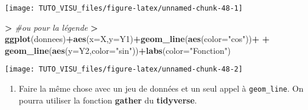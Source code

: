 \documentclass[]{article}
\newenvironment{Shaded}{\begin{snugshade}}{\end{snugshade}}
\newcommand{\CommentTok}[1]{\textcolor[rgb]{0.56,0.35,0.01}{\textit{#1}}}
\newcommand{\DataTypeTok}[1]{\textcolor[rgb]{0.13,0.29,0.53}{#1}}
\newcommand{\ErrorTok}[1]{\textcolor[rgb]{0.64,0.00,0.00}{\textbf{#1}}}
\newcommand{\KeywordTok}[1]{\textcolor[rgb]{0.13,0.29,0.53}{\textbf{#1}}}
\newcommand{\NormalTok}[1]{#1}
\newcommand{\OperatorTok}[1]{\textcolor[rgb]{0.81,0.36,0.00}{\textbf{#1}}}
\newcommand{\StringTok}[1]{\textcolor[rgb]{0.31,0.60,0.02}{#1}}
\providecommand{\tightlist}{%
  \setlength{\itemsep}{0pt}\setlength{\parskip}{0pt}}
\theoremstyle{definition}
\theoremstyle{definition}
\theoremstyle{definition}
\theoremstyle{remark}
\begin{document}
\begin{center}\texttt{[image: TUTO\_VISU\_files/figure-latex/unnamed-chunk-48-1]} \end{center}

\begin{Shaded}
\begin{Highlighting}[]
\OperatorTok{>}\StringTok{ }\CommentTok{#ou pour la légende}
\ErrorTok{>}\StringTok{ }\KeywordTok{ggplot}\NormalTok{(donnees)}\OperatorTok{+}\KeywordTok{aes}\NormalTok{(}\DataTypeTok{x=}\NormalTok{X,}\DataTypeTok{y=}\NormalTok{Y1)}\OperatorTok{+}\KeywordTok{geom_line}\NormalTok{(}\KeywordTok{aes}\NormalTok{(}\DataTypeTok{color=}\StringTok{"cos"}\NormalTok{))}\OperatorTok{+}
\OperatorTok{+}\StringTok{   }\KeywordTok{geom_line}\NormalTok{(}\KeywordTok{aes}\NormalTok{(}\DataTypeTok{y=}\NormalTok{Y2,}\DataTypeTok{color=}\StringTok{"sin"}\NormalTok{))}\OperatorTok{+}\KeywordTok{labs}\NormalTok{(}\DataTypeTok{color=}\StringTok{"Fonction"}\NormalTok{)}
\end{Highlighting}
\end{Shaded}

\begin{center}\texttt{[image: TUTO\_VISU\_files/figure-latex/unnamed-chunk-48-2]} \end{center}

\begin{enumerate}
\def\labelenumi{\arabic{enumi}.}
\setcounter{enumi}{2}
\tightlist
\item
  Faire la même chose avec un jeu de données et un seul appel à \texttt{geom\_line}. On pourra utiliser la fonction \textbf{gather} du \textbf{tidyverse}.
\end{enumerate}

\begin{Shaded}
\end{Shaded}
\end{document}
